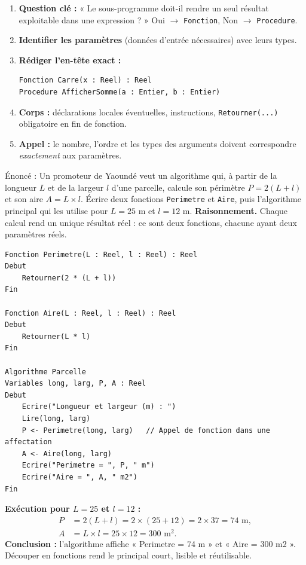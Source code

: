 \documentclass[11pt]{article}
\begin{document}
\begin{methode}
\begin{enumerate}
\item \textbf{Question clé :} « Le sous-programme doit-il rendre un seul résultat exploitable dans une expression ? » Oui $\to$ \texttt{Fonction}, Non $\to$ \texttt{Procedure}.
\item \textbf{Identifier les paramètres} (données d'entrée nécessaires) avec leurs types.
\item \textbf{Rédiger l'en-tête exact :}
\begin{lstlisting}
Fonction Carre(x : Reel) : Reel
Procedure AfficherSomme(a : Entier, b : Entier)
\end{lstlisting}
\item \textbf{Corps :} déclarations locales éventuelles, instructions, \texttt{Retourner(...)} obligatoire en fin de fonction.
\item \textbf{Appel :} le nombre, l'ordre et les types des arguments doivent correspondre \emph{exactement} aux paramètres.
\end{enumerate}
\end{methode}

\begin{exoresolu}
Énoncé : Un promoteur de Yaoundé veut un algorithme qui, à partir de la longueur $L$ et de la largeur $l$ d'une parcelle, calcule son périmètre $P = 2(L+l)$ et son aire $A = L \times l$. Écrire deux fonctions \texttt{Perimetre} et \texttt{Aire}, puis l'algorithme principal qui les utilise pour $L = 25$ m et $l = 12$ m.
\tcblower
\textbf{Raisonnement.} Chaque calcul rend un unique résultat réel : ce sont deux fonctions, chacune ayant deux paramètres réels.

\begin{lstlisting}
Fonction Perimetre(L : Reel, l : Reel) : Reel
Debut
    Retourner(2 * (L + l))
Fin

Fonction Aire(L : Reel, l : Reel) : Reel
Debut
    Retourner(L * l)
Fin

Algorithme Parcelle
Variables long, larg, P, A : Reel
Debut
    Ecrire("Longueur et largeur (m) : ")
    Lire(long, larg)
    P <- Perimetre(long, larg)   // Appel de fonction dans une affectation
    A <- Aire(long, larg)
    Ecrire("Perimetre = ", P, " m")
    Ecrire("Aire = ", A, " m2")
Fin
\end{lstlisting}

\textbf{Exécution pour $L = 25$ et $l = 12$ :}
\begin{align*}
P &= 2(L + l) = 2 \times (25 + 12) = 2 \times 37 = 74 \text{ m},\\
A &= L \times l = 25 \times 12 = 300 \text{ m}^2.
\end{align*}
\textbf{Conclusion :} l'algorithme affiche « Perimetre = 74 m » et « Aire = 300 m2 ». Découper en fonctions rend le principal court, lisible et réutilisable.
\end{exoresolu}
\end{document}

